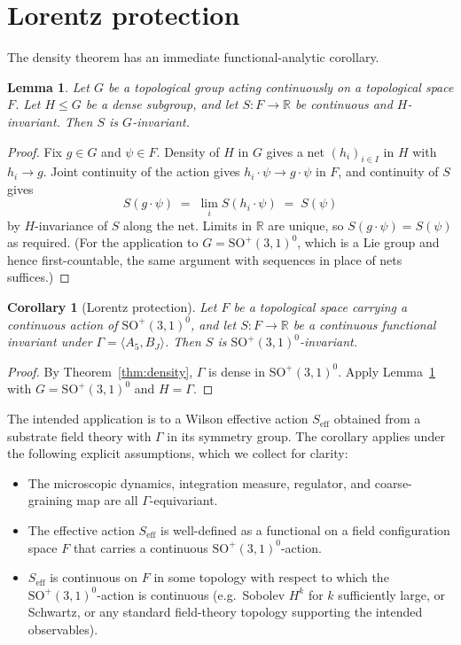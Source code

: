 \documentclass[11pt]{article}
\newtheorem{lemma}[theorem]{Lemma}
\newtheorem{corollary}[theorem]{Corollary}
\theoremstyle{remark}
\begin{document}
\section{Lorentz protection}

The density theorem has an immediate functional-analytic corollary.

\begin{lemma}\label{lem:protection}
Let $G$ be a topological group acting continuously on a topological
space $F$. Let $H \leq G$ be a dense subgroup, and let
$S: F \to \mathbb{R}$ be continuous and $H$-invariant. Then $S$ is
$G$-invariant.
\end{lemma}

\begin{proof}
Fix $g \in G$ and $\psi \in F$. Density of $H$ in $G$ gives a net
$(h_i)_{i \in I}$ in $H$ with $h_i \to g$. Joint continuity of the
action gives $h_i \cdot \psi \to g \cdot \psi$ in $F$, and continuity
of $S$ gives
\[
  S(g \cdot \psi) \;=\; \lim_i S(h_i \cdot \psi) \;=\; S(\psi)
\]
by $H$-invariance of $S$ along the net. Limits in $\mathbb{R}$ are
unique, so $S(g \cdot \psi) = S(\psi)$ as required. (For the
application to $G = \mathrm{SO}^+(3,1)^0$, which is a Lie group and
hence first-countable, the same argument with sequences in place of
nets suffices.)
\end{proof}

\begin{corollary}[Lorentz protection]\label{cor:lp}
Let $F$ be a topological space carrying a continuous action of
$\mathrm{SO}^+(3,1)^0$, and let $S: F \to \mathbb{R}$ be a continuous
functional invariant under $\Gamma = \langle A_5, B_J\rangle$. Then
$S$ is $\mathrm{SO}^+(3,1)^0$-invariant.
\end{corollary}

\begin{proof}
By Theorem~\ref{thm:density}, $\Gamma$ is dense in
$\mathrm{SO}^+(3,1)^0$. Apply Lemma~\ref{lem:protection} with
$G = \mathrm{SO}^+(3,1)^0$ and $H = \Gamma$.
\end{proof}

The intended application is to a Wilson effective action
$S_{\mathrm{eff}}$ obtained from a substrate field theory with $\Gamma$
in its symmetry group. The corollary applies under the following
explicit assumptions, which we collect for clarity:

\begin{itemize}
\item[(A1)] The microscopic dynamics, integration measure, regulator,
  and coarse-graining map are all $\Gamma$-equivariant.
\item[(A2)] The effective action $S_{\mathrm{eff}}$ is well-defined as
  a functional on a field configuration space $F$ that carries a
  continuous $\mathrm{SO}^+(3,1)^0$-action.
\item[(A3)] $S_{\mathrm{eff}}$ is continuous on $F$ in some topology
  with respect to which the $\mathrm{SO}^+(3,1)^0$-action is
  continuous (e.g.\ Sobolev $H^k$ for $k$ sufficiently large, or
  Schwartz, or any standard field-theory topology supporting the
  intended observables).
\end{itemize}
\end{document}
